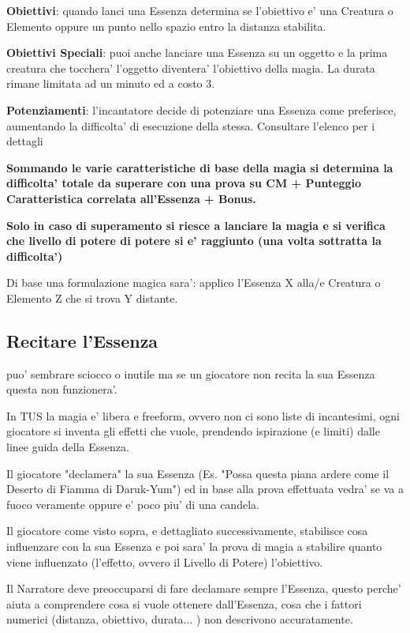 \documentclass[a4paper,11pt,twoside,openany]{book}
\begin{document}
\textbf{Obiettivi}: quando lanci una Essenza determina se l'obiettivo e' una Creatura o Elemento oppure un punto nello spazio entro la distanza stabilita.

\textbf{Obiettivi Speciali}: puoi anche lanciare una Essenza su un oggetto e la prima creatura che tocchera' l'oggetto diventera' l'obiettivo della magia. La durata rimane limitata ad un minuto ed a costo 3.

\textbf{Potenziamenti}: l'incantatore decide di potenziare una Essenza come preferisce, aumentando la difficolta' di esecuzione della stessa. Consultare l'elenco per i dettagli

\textbf{Sommando le varie caratteristiche di base della magia si determina la difficolta' totale da superare con una prova su CM + Punteggio Caratteristica correlata all'Essenza + Bonus.}

\textbf{Solo in caso di superamento si riesce a lanciare la magia e si verifica che livello di potere di potere si e' raggiunto (una volta sottratta la difficolta')}

Di base una formulazione magica sara': applico l'Essenza X alla/e Creatura o Elemento Z che si trova Y distante.

\subsection{Recitare l'Essenza}

\label{recitare-lessenza}

puo' sembrare sciocco o inutile ma se un giocatore non recita la sua Essenza questa non funzionera'.

In TUS la magia e' libera e freeform, ovvero non ci sono liste di incantesimi, ogni giocatore si inventa gli effetti che vuole, prendendo ispirazione (e limiti) dalle linee guida della Essenza.

Il giocatore "declamera" la sua Essenza (Es. "Possa questa piana ardere come il Deserto di Fiamma di Daruk-Yum") ed in base alla prova effettuata vedra' se va a fuoco veramente oppure e' poco piu' di una candela.

Il giocatore come visto sopra, e dettagliato successivamente, stabilisce cosa influenzare con la sua Essenza e poi sara' la prova di magia a stabilire quanto viene influenzato (l'effetto, ovvero il Livello di Potere) l'obiettivo.

Il Narratore deve preoccuparsi di fare declamare sempre l'Essenza, questo perche' aiuta a comprendere cosa si vuole ottenere dall'Essenza, cosa che i fattori numerici (distanza, obiettivo, durata... ) non descrivono accuratamente.
\end{document}
